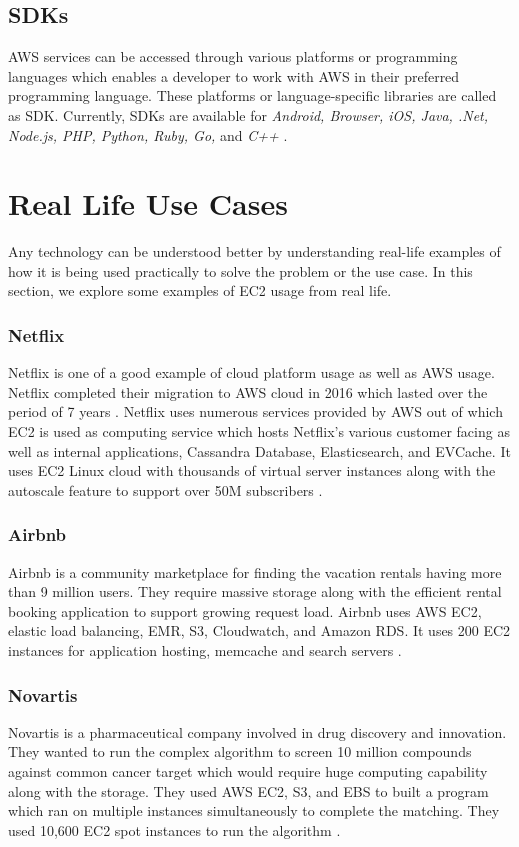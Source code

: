\subsection{SDKs}
AWS services can be accessed through various platforms or programming languages which enables a developer to work with AWS in their preferred programming language. These platforms or language-specific libraries are called as SDK. Currently, SDKs are available for \emph{Android, Browser, iOS, Java, .Net, Node.js, PHP, Python, Ruby, Go,} and \emph{C++} \cite{www-aws-ec2-sdk}. 

\section{Real Life Use Cases}
Any technology can be understood better by understanding real-life examples of how it is being used practically to solve the problem or the use case. In this section, we explore some examples of EC2 usage from real life.

\subsubsection{Netflix}
Netflix is one of a good example of cloud platform usage as well as AWS usage. Netflix completed their migration to AWS cloud in 2016 which lasted over the period of 7 years \cite{www-media-netflix}. Netflix uses numerous services provided by AWS out of which EC2 is used as computing service which hosts Netflix's various customer facing as well as internal applications, Cassandra Database, Elasticsearch, and EVCache. It uses EC2 Linux cloud with thousands of virtual server instances along with the autoscale feature to support over 50M subscribers \cite{www-brendangregg}.

\subsubsection{Airbnb}
Airbnb is a community marketplace for finding the vacation rentals having more than 9 million users. They require massive storage along with the efficient rental booking application to support growing request load. Airbnb uses AWS EC2, elastic load balancing, EMR, S3, Cloudwatch, and Amazon RDS. It uses 200 EC2 instances for application hosting, memcache and search servers \cite{www-aws-ec2-airbnb}.

\subsubsection{Novartis}
Novartis is a pharmaceutical company involved in drug discovery and innovation. They wanted to run the complex algorithm to screen 10 million compounds against common cancer target which would require huge computing capability along with the storage. They used AWS EC2, S3, and EBS to built a program which ran on multiple instances simultaneously to complete the matching. They used 10,600 EC2 spot instances to run the algorithm \cite{www-aws-ec2-novartis}.

